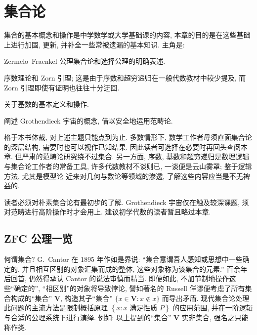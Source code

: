 
\chapter{集合论}
集合的基本概念和操作是中学数学或大学基础课的内容, 本章的目的是在这些基础上进行加固, 更新, 并补全一些常被遗漏的基本知识. 主角是:
\begin{compactitem}
	\item Zermelo--Fraenkel 公理集合论和选择公理的明确表述.
	\item 序数理论和 Zorn 引理; 这是由于序数和超穷递归在一般代数教材中较少提及, 而 Zorn 引理即使有证明也往往十分迂回.
	\item 关于基数的基本定义和操作.
	\item 阐述 Grothendieck 宇宙的概念, 借以安全地运用范畴论.
\end{compactitem}

格于本书体裁, 对上述主题只能点到为止. 多数情形下, 数学工作者毋须直面集合论的深层结构, 需要时也可以视作已知结果. 因此读者可选择在必要时再回头查阅本章. 但严肃的范畴论研究绕不过集合. 另一方面, 序数, 基数和超穷递归是数理逻辑与集合论工作者的常备工具, 许多代数教材不谈则已, 一谈便是云山雾罩; 鉴于逻辑方法, 尤其是模型论 \cite{Feng17} 近来对几何与数论等领域的渗透, 了解这些内容应当是不无裨益的. 

\begin{wenxintishi}
	读者必须对朴素集合论有最初步的了解. Grothendieck 宇宙仅在触及较深课题, 须对范畴进行高阶操作时才会用上. 建议初学代数的读者暂且略过本章.
\end{wenxintishi}

\section{ZFC 公理一览}\label{sec:ZFC}
何谓集合? G.\ Cantor 在 1895 年\cite[p.481]{Cantor95}作如是界说: ``集合意谓吾人感知或思想中一些确定的, 并且相互区别的对象汇集而成的整体, 这些对象称为该集合的元素.'' 百余年后回首, 仍然得承认 Cantor 的说法审慎而精当. 即便如此, 不加节制地操作这些``确定的'', ``相区别''的对象将导致悖论, 譬如著名的 Russell 佯谬便考虑了所有集合构成的``集合'' $\textbf{V}$, 构造其子``集合'' $\{x \in \textbf{V} : x \notin x\}$ 而导出矛盾. 现代集合论处理此问题的主流方法是限制概括原理 $\left\{x : x \text{ 满足性质 } P\right \}$ 的应用范围, 并在一阶逻辑与合适的公理系统下进行演绎. 例如: 以上提到的``集合'' $\textbf{V}$ 实非集合, 强名之只能称作类.

